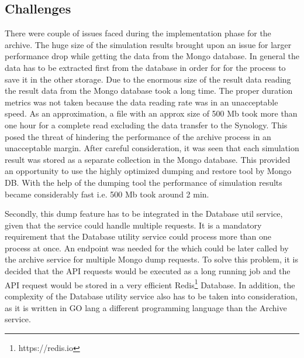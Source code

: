 \subsection{Challenges}
There were couple of issues faced during the implementation phase for the archive. The huge size of the simulation results brought upon an issue for larger
performance drop while getting the data from the Mongo database. In general the data has to be extracted first from the database in order for for the process
to save it in the other storage. Due to the enormous size of the result data reading the result data from the Mongo database took a long time. The proper duration
metrics was not taken because the data reading rate was in an unacceptable speed. As an approximation, a file with an approx size of 500 Mb took more than one hour 
for a complete read excluding the data transfer to the Synology. This posed the threat of hindering the performance of the archive process in an unacceptable margin.
After careful consideration, it was seen that each simulation result was stored as a separate collection in the Mongo database. This provided an opportunity to use
the highly optimized dumping and restore tool by Mongo DB. With the help of the dumping tool the performance of simulation results became considerably fast i.e.
500 Mb took around 2 min.

Secondly, this dump feature has to be integrated in the Database util service, given that the service could handle multiple requests. It is a mandatory requirement that the Database
utility service could process more than one process at once. An endpoint was needed for the which could be later called by the archive service for multiple Mongo dump
requests. To solve this problem, it is decided that the API requests would be executed as a long running job and the API request would be stored in a very efficient 
Redis\footnote{https://redis.io} Database. In addition, the complexity of the Database utility service also has to be taken into consideration, as it 
is written in GO lang a different programming language than the Archive service.
